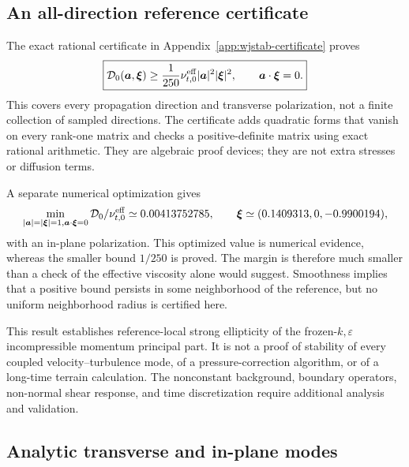 \documentclass[11pt,a4paper]{article}
\numberwithin{equation}{section}
\begin{document}
\subsection{An all-direction reference certificate}

The exact rational certificate in Appendix~\ref{app:wjstab-certificate}
proves
\begin{equation}
 \boxed{\mathcal D_0(\boldsymbol a,\boldsymbol\xi)
 \geq\frac1{250}\nu_{t,0}^{\rm eff}
           |\boldsymbol a|^2|\boldsymbol\xi|^2,
 \qquad\boldsymbol a\cdot\boldsymbol\xi=0.}
 \label{eq:wjstab-certified}
\end{equation}
This covers every propagation direction and transverse polarization,
not a finite collection of sampled directions. The certificate adds
quadratic forms that vanish on every rank-one matrix and checks a
positive-definite matrix using exact rational arithmetic. They are
algebraic proof devices; they are not extra stresses or diffusion terms.

A separate numerical optimization gives
\begin{equation}
 \min_{|\boldsymbol a|=|\boldsymbol\xi|=1,
                  \boldsymbol a\cdot\boldsymbol\xi=0}
    \mathcal D_0/\nu_{t,0}^{\rm eff}
 \simeq0.00413752785,
 \qquad\boldsymbol\xi\simeq(0.1409313,0,-0.9900194),
 \label{eq:wjstab-sampled-minimum}
\end{equation}
with an in-plane polarization. This optimized value is numerical
evidence, whereas the smaller bound $1/250$ is proved. The margin is
therefore much smaller than a check of the effective viscosity alone
would suggest. Smoothness implies that a positive bound persists in
some neighborhood of the reference, but no uniform neighborhood radius
is certified here.

This result establishes reference-local strong ellipticity of the
frozen-$k,\varepsilon$ incompressible momentum principal part. It is
not a proof of stability of every coupled velocity--turbulence mode,
of a pressure-correction algorithm, or of a long-time terrain
calculation. The nonconstant background, boundary operators,
non-normal shear response, and time discretization require additional
analysis and validation.

\subsection{Analytic transverse and in-plane modes}
\end{document}
